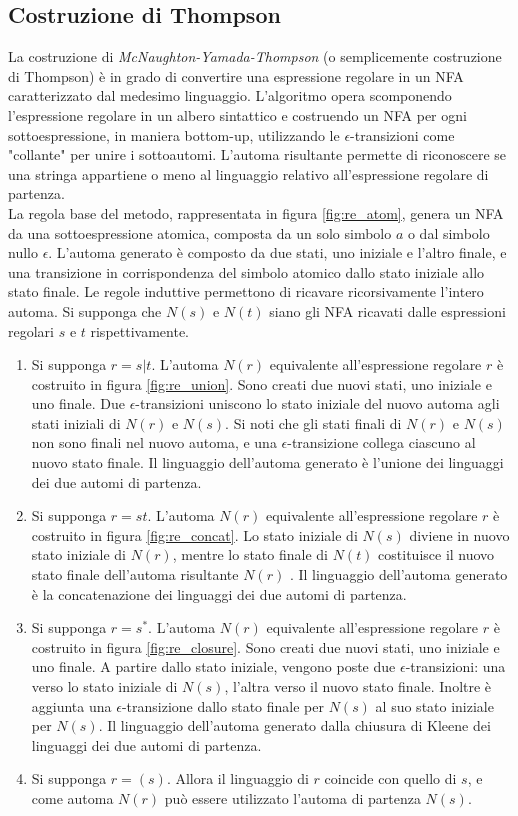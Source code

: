 \subsection{Costruzione di Thompson} \label{thompson}
La costruzione di \emph{McNaughton-Yamada-Thompson} (o semplicemente costruzione di Thompson) è in grado di convertire una espressione regolare in un NFA caratterizzato dal medesimo linguaggio. L'algoritmo opera scomponendo l'espressione regolare in un albero sintattico e costruendo un NFA per ogni sottoespressione, in maniera bottom-up, utilizzando le $\epsilon$-transizioni come "collante" per unire i sottoautomi. L'automa risultante permette di riconoscere se una stringa appartiene o meno al linguaggio relativo all'espressione regolare di partenza.\\
La regola base del metodo, rappresentata in figura \ref{fig:re_atom}, genera un NFA da una sottoespressione atomica, composta da un solo simbolo $a$ o dal simbolo nullo $\epsilon$. L'automa generato è composto da due stati, uno iniziale e l'altro finale, e una transizione in corrispondenza del simbolo atomico dallo stato iniziale allo stato finale.
Le regole induttive permettono di ricavare ricorsivamente l'intero automa.
Si supponga che $N(s)$ e $N(t)$ siano gli NFA ricavati dalle espressioni regolari $s$ e $t$ rispettivamente.
\begin{enumerate}
\item Si supponga $r = s|t$. L'automa $N(r)$ equivalente all'espressione regolare $r$ è costruito in figura \ref{fig:re_union}. Sono creati due nuovi stati, uno iniziale e uno finale. Due $\epsilon$-transizioni uniscono lo stato iniziale del nuovo automa agli stati iniziali di $N(r)$ e $N(s)$. Si noti che gli stati finali di $N(r)$ e $N(s)$ non sono finali nel nuovo automa, e una $\epsilon$-transizione collega ciascuno al nuovo stato finale. Il linguaggio dell'automa generato è l'unione dei linguaggi dei due automi di partenza.
\item Si supponga $r = st$. L'automa $N(r)$ equivalente all'espressione regolare $r$ è costruito in figura \ref{fig:re_concat}. Lo stato iniziale di $N(s)$ diviene in nuovo stato iniziale di $N(r)$, mentre lo stato finale di $N(t)$ costituisce il nuovo stato finale dell'automa risultante $N(r)$ . Il linguaggio dell'automa generato è la concatenazione dei linguaggi dei due automi di partenza.
\item Si supponga $r = s^*$. L'automa $N(r)$ equivalente all'espressione regolare $r$ è costruito in figura \ref{fig:re_closure}. Sono creati due nuovi stati, uno iniziale e uno finale. A partire dallo stato iniziale, vengono poste due $\epsilon$-transizioni: una verso lo stato iniziale di $N(s)$, l'altra verso il nuovo stato finale. Inoltre è aggiunta una $\epsilon$-transizione dallo stato finale per $N(s)$ al suo stato iniziale per $N(s)$. Il linguaggio dell'automa generato dalla chiusura di Kleene dei linguaggi dei due automi di partenza.
\item Si supponga $r = (s)$. Allora il linguaggio di $r$ coincide con quello di $s$, e come automa $N(r)$ può essere utilizzato l'automa di partenza $N(s)$.
\end{enumerate} 


